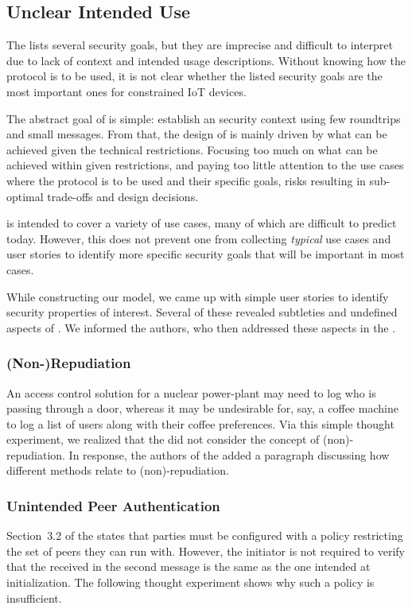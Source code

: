 \documentclass[a4paper,twoside]{article}
\begin{document}
\subsection{Unclear Intended Use}
\label{sec:unclearProtocolUse}
%
The \mEdhoc{} \mSpec{} lists several security goals, but they are
imprecise and difficult to interpret due to lack of context and intended usage
descriptions.
%
Without knowing how the protocol is to be used,
it is not clear whether the listed security goals are the most important ones
for constrained IoT devices.
%

The abstract goal of \mEdhoc{} is simple: establish an \mOscore{} security
context using few roundtrips and small messages.
%
From that, the design of \mEdhoc{} is mainly driven by what
can be achieved given the technical restrictions.
%
Focusing too much on what can be achieved within given restrictions, and paying
too little attention to the use cases where the
protocol is to be used and their specific goals, risks resulting in
sub-optimal trade-offs and design decisions.
%

\mEdhoc{} is intended to cover a variety of use cases, many of which are
difficult to predict today.
%
However, this does not
prevent one from collecting \emph{typical} use cases and user stories
to identify more specific security goals that will be important in most cases.
%

While constructing our model, we came up with simple user stories to identify
security properties of interest.
%
Several of these revealed subtleties and undefined aspects of \mEdhoc{}.
%
We informed the \mEdhoc{} authors, who then addressed these aspects in the
\mSpec{}.
%

\subsubsection{(Non-)Repudiation}
An access control solution for a nuclear power-plant may need to log who is
passing through a door, whereas it may be undesirable for, say, a coffee
machine to log a list of users along with their coffee preferences.
%
Via this simple thought experiment, we realized that the \mSpec{} did not
consider the concept of (non)-repudiation.
%
In response, the authors of the \mSpec{} added a paragraph discussing how
different methods relate to (non)-repudiation.

\subsubsection{Unintended Peer Authentication}
Section~3.2 of the \mSpec{} states that parties must be configured
with a policy restricting the set of peers they can run \mEdhoc{} with.
%
However, the initiator is not required to verify that the \mIdcredr{} received
in the second message is the same as the one intended at initialization.
%
The following thought experiment shows why such a policy is insufficient.
%
\end{document}
